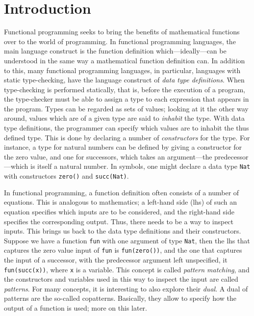 \chapter{Introduction}
\label{ch:intro}

Functional programming seeks to bring the benefits of mathematical functions over to the world of programming. In functional programming languages, the main language construct is the function definition which---ideally---can be understood in the same way a mathematical function definition can. In addition to this, many functional programming languages, in particular, languages with static type-checking, have the language construct of \textit{data type definitions}. When type-checking is performed statically, that is, before the execution of a program, the type-checker must be able to assign a type to each expression that appears in the program. Types can be regarded as sets of values; looking at it the other way around, values which are of a given type are said to \textit{inhabit} the type. With data type definitions, the programmer can specify which values are to inhabit the thus defined type. This is done by declaring a number of \textit{constructors} for the type. For instance, a type for natural numbers can be defined by giving a constructor for the zero value, and one for successors, which takes an argument---the predecessor---which is itself a natural number. In symbols, one might declare a data type \texttt{Nat} with constructors \texttt{zero()} and \texttt{succ(Nat)}.

In functional programming, a function definition often consists of a number of equations. This is analogous to mathematics; a left-hand side (lhs) of such an equation specifies which inputs are to be considered, and the right-hand side specifies the corresponding output. Thus, there needs to be a way to inspect inputs. This brings us back to the data type definitions and their constructors. Suppose we have a function \texttt{fun} with one argument of type \texttt{Nat}, then the lhs that captures the zero value input of \texttt{fun} is \texttt{fun(zero())}, and the one that captures the input of a successor, with the predecessor argument left unspecified, it \texttt{fun(succ(x))}, where \texttt{x} is a variable. This concept is called \textit{pattern matching}, and the constructors and variables used in this way to inspect the input are called \textit{patterns}. For many concepts, it is interesting to also explore their \textit{dual}. A dual of patterns are the so-called copatterns. Basically, they allow to specify how the output of a function is used; more on this later.

